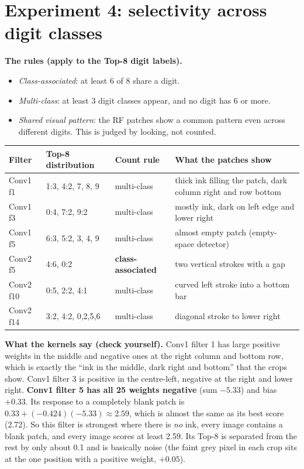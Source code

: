 \documentclass[11pt]{article}
\begin{document}
\section{Experiment 4: selectivity across digit classes}

\textbf{The rules (apply to the Top-8 digit labels).}
\begin{itemize}
\item \emph{Class-associated}: at least 6 of 8 share a digit.
\item \emph{Multi-class}: at least 3 digit classes appear, and no digit has 6 or more.
\item \emph{Shared visual pattern}: the RF patches show a common pattern even across different digits. This is judged by looking, not counted.
\end{itemize}

\begin{table}[h]
\centering
\small
\begin{tabular}{p{1.7cm}p{3.3cm}p{2.5cm}p{7.2cm}}
\toprule
Filter & Top-8 distribution & Count rule & What the patches show \\
\midrule
Conv1 f1 & 1:3, 4:2, 7, 8, 9 & multi-class & thick ink filling the patch, dark column right and row bottom \\
Conv1 f3 & 0:4, 7:2, 9:2 & multi-class & mostly ink, dark on left edge and lower right \\
Conv1 f5 & 6:3, 5:2, 3, 4, 9 & multi-class & almost empty patch (empty-space detector) \\
Conv2 f5 & 4:6, 0:2 & \textbf{class-associated} & two vertical strokes with a gap \\
Conv2 f10 & 0:5, 2:2, 4:1 & multi-class & curved left stroke into a bottom bar \\
Conv2 f14 & 3:2, 4:2, 0,2,5,6 & multi-class & diagonal stroke to lower right \\
\bottomrule
\end{tabular}
\end{table}

\textbf{What the kernels say (check yourself).} Conv1 filter 1 has large positive weights in the middle and negative ones at the right column and bottom row, which is exactly the ``ink in the middle, dark right and bottom'' that the crops show. Conv1 filter 3 is positive in the centre-left, negative at the right and lower right. \textbf{Conv1 filter 5 has all 25 weights negative} (sum $-5.33$) and bias $+0.33$. Its response to a completely blank patch is $0.33+(-0.424)(-5.33)\approx2.59$, which is almost the same as its best score (2.72). So this filter is strongest where there is \emph{no} ink, every image contains a blank patch, and every image scores at least 2.59. Its Top-8 is separated from the rest by only about 0.1 and is basically noise (the faint grey pixel in each crop sits at the one position with a positive weight, $+0.05$).
\end{document}
